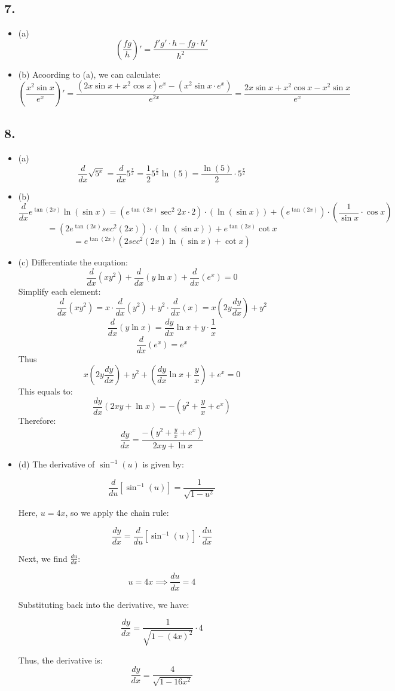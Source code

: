 \documentclass[a4paper, 7pt]{article}
\begin{document}
\subsection*{7.}
\begin{itemize}
    \item (a)
    \[
    (\frac{fg}{h})' = \frac{f'g'\cdot h-fg\cdot h'}{h^2}
    \]
    \item (b)
    Acoording to (a), we can calculate:
    \[
    (\frac{x^2 \sin x}{e^x})' = \frac{(2x\sin x + x^2\cos x)e^x-(x^2 \sin x \cdot e^x)}{e^{2x}} = \frac{2x\sin x +x^2\cos x- x^2\sin x}{e^x}
    \]
\end{itemize}
\subsection*{8.}
\begin{itemize}
    \item (a)
    \[
    \frac{d}{dx} \sqrt{5^x} = \frac{d}{dx} 5^{\frac{x}{2}} = \frac{1}{2} 5^{\frac{x}{2}} \ln(5) = \frac{\ln(5)}{2}\cdot 5^\frac{x}{2}
    \]
    \item (b)
    \[
    \frac{d}{dx} e^{\tan(2x)} \ln(\sin x) = (e^{\tan(2x)} \sec^2 2x \cdot 2) \cdot (\ln (\sin x)) + (e^{\tan(2x)}) \cdot (\frac{1}{\sin x} \cdot \cos x)
    \]
    \[
    = (2e^{\tan(2x)} sec^2 (2x)) \cdot (\ln(\sin x)) + e^{\tan(2x)}\cot x 
    \]
    \[
    = e^{\tan(2x)}(2sec^2 (2x) \ln(\sin x) + \cot x)
    \]
    \item (c)
    Differentiate the euqation:
    \[
    \frac{d}{dx} (xy^2) + \frac{d}{dx} (y\ln x) + \frac{d}{dx} (e^x) = 0
    \]
    Simplify each element:
    \[
    \frac{d}{dx}(xy^2) = x \cdot \frac{d}{dx}(y^2) + y^2 \cdot \frac{d}{dx}(x) = x(2y \frac{dy}{dx}) + y^2
    \]
    \[
    \frac{d}{dx}(y \ln x) = \frac{dy}{dx} \ln x + y \cdot \frac{1}{x}
    \]
    \[
    \frac{d}{dx}(e^x) = e^x
    \]
    Thus
    \[
    x(2y \frac{dy}{dx}) + y^2 + \left(\frac{dy}{dx} \ln x + \frac{y}{x}\right) + e^x = 0
    \]
    This equals to:
    \[
    \frac{dy}{dx}(2xy + \ln x) = -\left(y^2 + \frac{y}{x} + e^x\right)
    \]
    Therefore:
    \[
    \frac{dy}{dx} = \frac{-(y^2 + \frac{y}{x} + e^x)}{2xy + \ln x}
    \]
    \item (d)
    The derivative of \( \sin^{-1}(u) \) is given by:

    \[
    \frac{d}{du}[\sin^{-1}(u)] = \frac{1}{\sqrt{1 - u^2}}
    \]

    Here, \( u = 4x \), so we apply the chain rule:

    \[
    \frac{dy}{dx} = \frac{d}{du}[\sin^{-1}(u)] \cdot \frac{du}{dx}
    \]

    Next, we find \( \frac{du}{dx} \):

    \[
    u = 4x \implies \frac{du}{dx} = 4
    \]

    Substituting back into the derivative, we have:

\[
\frac{dy}{dx} = \frac{1}{\sqrt{1 - (4x)^2}} \cdot 4
\]

Thus, the derivative is:
\[
\frac{dy}{dx} = \frac{4}{\sqrt{1 - 16x^2}}
\]
\end{itemize}
\end{document}
